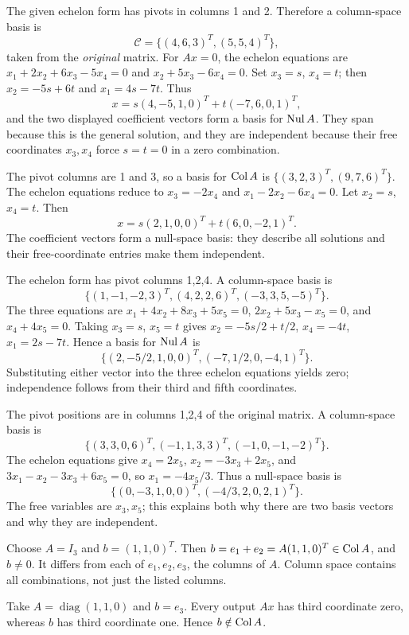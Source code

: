 The given echelon form has pivots in columns 1 and 2.
Therefore a column-space basis is
\[
 \mathcal C=\{(4,6,3)^T,(5,5,4)^T\},
\]
taken from the \emph{original} matrix.
For $Ax=0$, the echelon equations are
$x_1+2x_2+6x_3-5x_4=0$ and $x_2+5x_3-6x_4=0$.
Set $x_3=s$, $x_4=t$; then $x_2=-5s+6t$ and $x_1=4s-7t$.
Thus
\[
 x=s(4,-5,1,0)^T+t(-7,6,0,1)^T,
\]
and the two displayed coefficient vectors form a basis for $\operatorname{Nul} A$.
They span because this is the general solution, and they are independent
because their free coordinates $x_3,x_4$ force $s=t=0$ in a zero combination.

The pivot columns are 1 and 3, so a basis for $\operatorname{Col} A$ is
$\{(3,2,3)^T,(9,7,6)^T\}$.
The echelon equations reduce to
$x_3=-2x_4$ and $x_1-2x_2-6x_4=0$.
Let $x_2=s$, $x_4=t$. Then
\[
 x=s(2,1,0,0)^T+t(6,0,-2,1)^T.
\]
The coefficient vectors form a null-space basis: they describe all solutions
and their free-coordinate entries make them independent.

The echelon form has pivot columns 1,2,4. A column-space basis is
\[
 \{(1,-1,-2,3)^T,(4,2,2,6)^T,(-3,3,5,-5)^T\}.
\]
The three equations are
$x_1+4x_2+8x_3+5x_5=0$,
$2x_2+5x_3-x_5=0$, and $x_4+4x_5=0$.
Taking $x_3=s$, $x_5=t$ gives
$x_2=-5s/2+t/2$, $x_4=-4t$, $x_1=2s-7t$.
Hence a basis for $\operatorname{Nul} A$ is
\[
 \{(2,-5/2,1,0,0)^T,(-7,1/2,0,-4,1)^T\}.
\]
Substituting either vector into the three echelon equations yields zero;
independence follows from their third and fifth coordinates.

The pivot positions are in columns 1,2,4 of the original matrix.
A column-space basis is
\[
 \{(3,3,0,6)^T,(-1,1,3,3)^T,(-1,0,-1,-2)^T\}.
\]
The echelon equations give
$x_4=2x_5$, $x_2=-3x_3+2x_5$, and
$3x_1-x_2-3x_3+6x_5=0$, so $x_1=-4x_5/3$.
Thus a null-space basis is
\[
 \{(0,-3,1,0,0)^T,(-4/3,2,0,2,1)^T\}.
\]
The free variables are $x_3,x_5$; this explains both why there are two
basis vectors and why they are independent.

Choose $A=I_3$ and $b=(1,1,0)^T$.
Then $b=e_1+e_2=A(1,1,0)^T\in\operatorname{Col} A$, and $b\ne0$.
It differs from each of $e_1,e_2,e_3$, the columns of $A$.
Column space contains all combinations, not just the listed columns.

Take $A=\operatorname{diag}(1,1,0)$ and $b=e_3$.
Every output $Ax$ has third coordinate zero, whereas $b$ has third
coordinate one. Hence $b\notin\operatorname{Col} A$.

